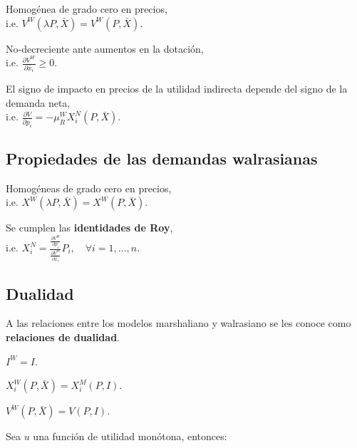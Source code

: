 \documentclass[8pt,a4paper]{extarticle}
\begin{document}
\begin{multicols}{3}
\begin{eqlist}
\item Homogénea de grado cero en precios, \\ i.e. $V^W (\lambda P, \bar{X}) = V^W (P, \bar{X})$.
\item No-decreciente ante aumentos en la dotación, \\ i.e. $\displaystyle \frac{\partial V^W}{\partial \bar{x}_i} \geq 0$.
\item El signo de impacto en precios de la utilidad indirecta depende del signo de la demanda neta, \\ i.e. $\displaystyle \frac{\partial V}{\partial p_i} = - \mu_R^W X_i^N (P, \bar{X})$.
\end{eqlist}

\subsection{Propiedades de las demandas walrasianas}

\begin{eqlist}
\item Homogéneas de grado cero en precios, \\ i.e. $X^W (\lambda P, \bar{X}) = X^W (P, \bar{X})$.
\item Se cumplen las \textbf{identidades de Roy}, \\ i.e. $\displaystyle X^N_i = \frac{\displaystyle \frac{\partial V^W}{\partial p_{i}}}{ \displaystyle \frac{\partial V^W}{\partial \bar{x}_i}} P_i, \quad \forall i = 1, \ldots, n$.
\end{eqlist}

\subsection{Dualidad}

A las relaciones entre los modelos marshaliano y walrasiano se les conoce como \textbf{relaciones de dualidad}.

\begin{eqlist}
\item $ \displaystyle I^W = I$.
\item $X^W_i (P, \bar{X}) = X^M_i (P, I)$.
\item $V^W(P, \bar{X}) = V(P, I)$.
\end{eqlist}

\begin{boxtheo}
	Sea $u$ una función de utilidad monótona, entonces:
	

\end{boxtheo}
\end{multicols}
\end{document}
